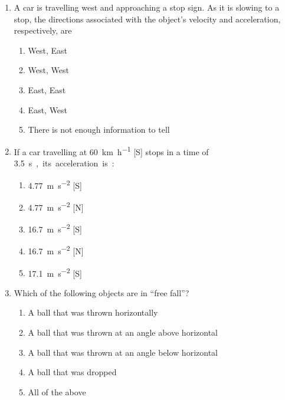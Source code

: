 \begin{multicols}{2}
\begin{enumerate}[leftmargin=12pt]
  \item A car is travelling west and approaching a stop sign. As it is
    slowing to a stop, the directions associated with the object's velocity and
    acceleration, respectively, are
    \begin{enumerate}[noitemsep]
    \item West, East
    \item West, West
    \item East, East
    \item East, West
    \item There is not enough information to tell
    \end{enumerate}
    

  \item If a car travelling at \SI{60}{\kilo\metre\per\hour} [S] stops
    in a time of \SI{3.5}\second, its acceleration is:
    \begin{enumerate}[noitemsep]
    \item \SI{4.77}{\metre\per\second\squared} [S]
    \item \SI{4.77}{\metre\per\second\squared} [N]
    \item \SI{16.7}{\metre\per\second\squared} [S]
    \item \SI{16.7}{\metre\per\second\squared} [N]
    \item \SI{17.1}{\metre\per\second\squared} [S]
    \end{enumerate}

  \item Which of the following objects are in ``free fall''?
    \begin{enumerate}[noitemsep]
    \item A ball that was thrown horizontally
    \item A ball that was thrown at an angle above horizontal
    \item A ball that was thrown at an angle below horizontal
    \item A ball that was dropped
    \item All of the above
  \end{enumerate}
    

\end{enumerate}
\end{multicols}
